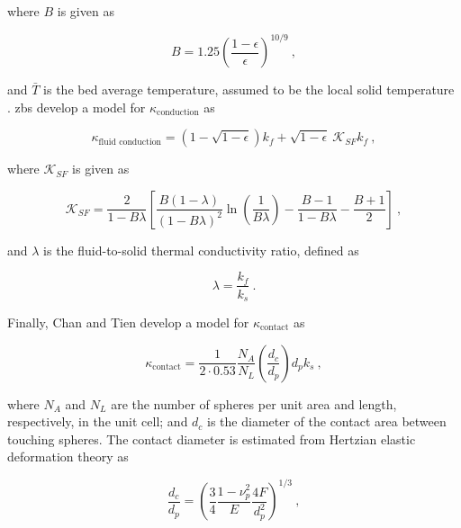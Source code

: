 \noindent where \(B\) is given as

\begin{equation}
\label{eq:KappaB}
B=1.25\left(\frac{1-\epsilon}{\epsilon}\right)^{10/9}\ ,
\end{equation}

\noindent and \(\bar{T}\) is the bed average temperature, assumed to be the local solid temperature \cite{auwerda_2011,breitbach}. \gls{zbs} develop a model for \(\kappa_\text{conduction}\) as \cite{tsotsas1987}

\begin{equation}
\label{eq:KappaFluidConductionZS}
\kappa_{\textrm{fluid conduction}}=\left(1-\sqrt{1-\epsilon}\right)k_f+\sqrt{1-\epsilon}\ \mathscr{K}_{SF}k_f\ ,
\end{equation}

\noindent where \(\mathscr{K}_{SF}\) is given as

\begin{equation}
\label{eq:ZBSKSF}
\mathscr{K}_{SF}=\frac{2}{1-B\lambda}\left\lbrack\frac{B(1-\lambda)}{(1-B\lambda)^2}\ln\left({\frac{1}{B\lambda}}\right)-\frac{B-1}{1-B\lambda}-\frac{B+1}{2}\right\rbrack\ ,
\end{equation}

\noindent and \(\lambda\) is the fluid-to-solid thermal conductivity ratio, defined as

\begin{equation}
\label{eq:lambdaDef}
\lambda=\frac{k_f}{k_s}\ .
\end{equation}

\noindent Finally, Chan and Tien develop a model for \(\kappa_\text{contact}\) as \cite{chan}

\begin{equation}
\label{eq:KappaSolidConductionCT}
\kappa_\text{contact}=\frac{1}{2\cdot0.53}\frac{N_A}{N_L}\left(\frac{d_c}{d_p}\right)d_pk_s\ ,
\end{equation}

\noindent where \(N_A\) and \(N_L\) are the number of spheres per unit area and length, respectively, in the unit cell; and \(d_c\) is the diameter of the contact area between touching spheres. The contact diameter is estimated from Hertzian elastic deformation theory as \cite{you}

\begin{equation}
\label{eq:ContactRadius}
\frac{d_c}{d_p}=\left(\frac{3}{4}\frac{1-\nu_p^2}{E}\frac{4F}{d_p^2}\right)^{1/3}\ ,
\end{equation}

